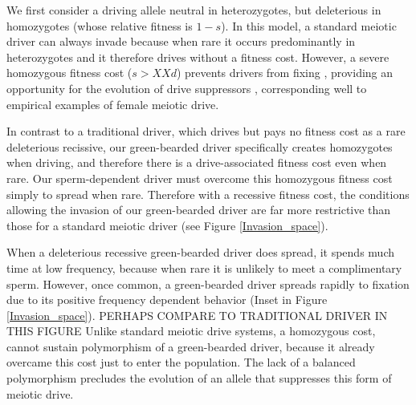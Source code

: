 \documentclass[12pt,letterpaper]{article}
\newcommand{\yb}[1]{{ \color{blue} #1}}
\begin{document}
We first consider a driving allele neutral in heterozygotes, 
	but deleterious in homozygotes (whose relative fitness is $1-s$).  
In this model, a standard meiotic driver can always invade because 
	when rare it occurs predominantly in heterozygotes and it therefore drives without a fitness cost. 
However, a severe homozygous fitness cost ($s>XXd$) prevents  
	drivers from fixing  \citep{Prout1973}, 
	providing an opportunity for the evolution of
	drive suppressors \citep{XX}, corresponding well to 
	empirical examples of female meiotic drive. 




In contrast to a traditional driver, which drives but pays no fitness cost as a rare deleterious recissive, 
	our green-bearded driver specifically creates homozygotes when driving, and therefore there is a drive-associated fitness cost even when rare. 
Our sperm-dependent driver must overcome this homozygous fitness cost simply to spread when rare.
Therefore with a recessive fitness cost,
	the conditions allowing the invasion of our green-bearded driver 
 	are far more restrictive than those for a standard meiotic driver (see Figure \ref{Invasion_space}).


When a deleterious recessive green-bearded driver does spread, 
	it spends much time at low frequency, because when rare it is unlikely to meet a complimentary sperm. 
However, once common, a green-bearded driver spreads rapidly to fixation due to its
	positive frequency dependent behavior (Inset in Figure \ref{Invasion_space}).  \yb{PERHAPS COMPARE TO TRADITIONAL DRIVER IN THIS FIGURE} 
Unlike standard meiotic drive systems, a homozygous cost, cannot sustain polymorphism of a green-bearded driver, 
	because it already overcame this cost just to enter the population.
The lack of a balanced polymorphism precludes the evolution of an allele that suppresses this form of meiotic drive.
\end{document}
